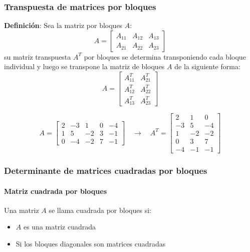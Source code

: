 \subsubsection{Transpuesta de matrices por bloques}

\textbf{Definición}: Sea la matriz por bloques \(A\):
\[
  A= \begin{bmatrix}
    A_{11} & A_{12} & A_{13} \\
    A_{21} & A_{22} & A_{23}
  \end{bmatrix}
\]
su matriz transpuesta \(A^T\) por bloques se determina transponiendo cada bloque individual y luego se transpone la matriz de bloques \(A\) de la siguiente forma:
\[
A = \begin{bmatrix}
  A_{11}^T & A_{21}^T \\
  A_{12}^T & A_{22}^T \\
  A_{13}^T & A_{23}^T
\end{bmatrix}
\]

\[
  A = \left[\begin{array}{ccc|cc}
    2 & -3 & 1 & 0 & -4 \\
    1 & 5 & -2 & 3 & -1 \\
    \hline
    0 & -4 & -2 & 7 & -1
  \end{array}\right] \quad \rightarrow \quad A^T = \left[\begin{array}{cc|c}
    2 & 1 & 0 \\
    -3 & 5 & -4 \\
    1 & -2 & -2 \\
    \hline
    0 & 3 & 7 \\
    -4 & -1 & -1
  \end{array}\right] 
\]

\subsubsection{Determinante de matrices cuadradas por bloques}

\paragraph{Matriz cuadrada por bloques}

Una matriz \(A\) se llama cuadrada por bloques si:
\begin{itemize}
  \item \(A\) es una matriz cuadrada
  \item Si los bloques diagonales son matrices cuadradas
\end{itemize}

